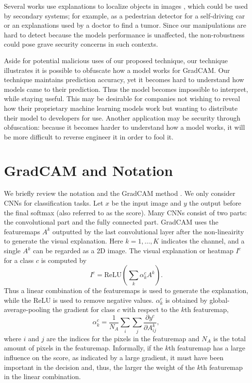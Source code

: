 \documentclass{article}
\begin{document}
Several works use explanations to localize objects in images \citep{simplegrad,GradCAM,amogh_localization}, which could be used by secondary systems; for example, as a pedestrian detector for a self-driving car or an explanations used by a doctor to find a tumor. Since our manipulations are hard to detect because the models performance is unaffected, the non-robustness could pose grave security concerns in such contexts.

Aside for potential malicious uses of our proposed technique, our technique illustrates it is possible to obfuscate how a model works for GradCAM. Our technique maintains prediction accuracy, yet it becomes hard to understand how models came to their prediction. Thus the model becomes impossible to interpret, while staying useful. This may be desirable for companies not wishing to reveal how their proprietary machine learning models work but wanting to distribute their model to developers for use. Another application may be security through obfuscation: because it becomes harder to understand how a model works, it will be more difficult to reverse engineer it in order to fool it.

\section{GradCAM and Notation}

We briefly review the notation and the GradCAM method \citep{GradCAM}. We only consider CNNs for classification tasks. Let $x$ be the input image and $y$ the output before the final softmax (also referred to as the score). Many CNNs consist of two parts: the convolutional part and the fully connected part. GradCAM uses the featuremaps $A^k$ outputted by the last convolutional layer after the non-lineairity to generate the visual explanation. Here $k = 1,\ldots,K$ indicates the channel, and a single $A^k$ can be regarded as a 2D image. The visual explanation or heatmap $I^c$ for a class $c$ is computed by
\begin{equation}
I^c = \text{ReLU}\left(\sum_k \alpha_k^c A^k\right). \label{eq_I}
\end{equation}
Thus a linear combination of the featuremaps is used to generate the explanation, while the ReLU is used to remove negative values. $\alpha_k^c$ is obtained by global-average-pooling the gradient for class $c$ with respect to the $k$th featuremap,
\begin{equation}
\alpha_k^c = \frac{1}{N_A} \sum_i \sum_j \frac{\partial y^c}{\partial A^k_{ij}}, \label{eq_alpha}
\end{equation}
where $i$ and $j$ are the indices for the pixels in the featuremap  and $N_A$ is the total amount of pixels in the featuremap. Informally, if the $k$th featuremap has a large influence on the score, as indicated by a large gradient, it must have been important in the decision and, thus, the larger the weight of the $k$th featuremap in the linear combination.  
\end{document}
